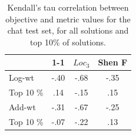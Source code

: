 \documentclass[11pt]{article}
\begin{document}

\begin{table}[th!]
\begin{tabular}{l|ccc}
& 1-1 & $Loc_3$ & Shen F\\
\hline
Log-wt & -.40 & -.68 & -.35\\
Top 10 \% & .14 & -.15 & .15\\
\hline
Add-wt & -.31 & -.67 & -.25\\
Top 10 \% & -.07 & -.22 & .13\\
\end{tabular}
\caption{Kendall's tau correlation between objective and metric
  values for the chat test set, for all solutions and top
  10\% of solutions.}
\label{test-chat-correlation}
\end{table}
\end{document}

